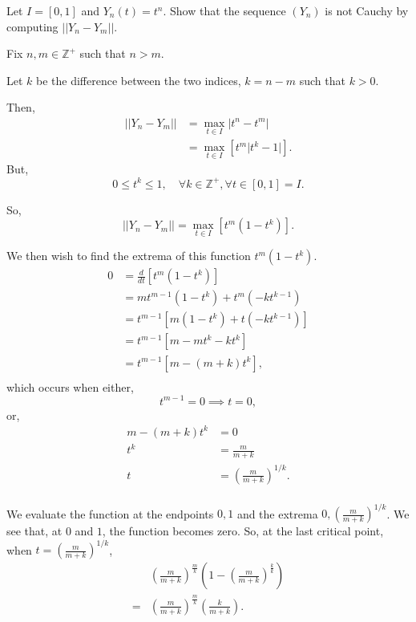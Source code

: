 \documentclass[../hw5]{subfiles}
\begin{document}
Let $I=[0,1]$ and $Y_n(t)=t^n$. Show that the sequence $(Y_n)$ is not Cauchy by computing $||Y_n-Y_m||$.

Fix $n,m\in\mathbb{Z}^+$ such that $n>m$.

Let $k$ be the difference between the two indices, $k=n-m$ such that $k>0$.

Then,
\begin{align*}
    ||Y_n-Y_m||&=\underset{t\in I}{\max}|t^n-t^m|\\
    &=\underset{t \in I}{\max}\left[ t^m\big|t^k-1\big| \right].
\end{align*}
But, \[0\leq t^k\leq 1,\quad \forall k \in\mathbb{Z}^+, \forall t \in [0,1] = I.\]

So, \[||Y_n-Y_m||=\underset{t \in I}{\max}\left[ t^m\left( 1-t^k \right) \right].\]

We then wish to find the extrema of this function $t^m\left( 1-t^k \right)$.
\begin{align*}
    0&=\frac{d}{dt}\left[ t^m\left( 1-t^k \right) \right]\\
    &=mt^{m-1}\left( 1-t^k \right)+t^m\left( -kt^{k-1} \right)\\
    &=t^{m-1}\left[ m\left( 1-t^k \right) +t\left( -kt^{k-1} \right)\right]\\
    &=t^{m-1}\left[ m-mt^k-kt^k \right]\\
    &=t^{m-1}\left[ m-(m+k)t^k \right],\\
\end{align*}
which occurs when either,
\[t^{m-1}=0 \implies t=0,\]
or,
\begin{align*}
    m-(m+k)t^k&=0\\
    t^k&=\frac{m}{m+k}\\
    t&={\left( \frac{m}{m+k} \right)}^{1/k}.\\
\end{align*}

We evaluate the function at the endpoints $0,1$ and the extrema $0,{\left( \frac{m}{m+k} \right)}^{1/k}$.
We see that, at $0$ and $1$, the function becomes zero. So, at the last critical point, when $t={\left( \frac{m}{m+k} \right)}^{1/k}$,
\begin{align*}
    &{\left( \frac{m}{m+k} \right)}^{\frac{m}{k}}\left( 1-{\left( \frac{m}{m+k} \right)}^{\frac{k}{k}} \right)\\
    =&{\left( \frac{m}{m+k} \right)}^{\frac{m}{k}}\left( \frac{k}{m+k} \right).\\
\end{align*}
\end{document}

